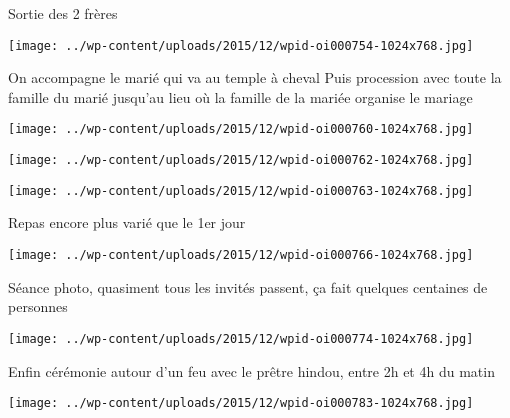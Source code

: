  \newline
 Sortie des 2 frères \newline
 \newline
\centerline{\texttt{[image: ../wp-content/uploads/2015/12/wpid-oi000754-1024x768.jpg]} } 
 \newline
 On accompagne le marié qui va au temple à cheval \newline
 Puis procession avec toute la famille du marié jusqu'au lieu où la famille de la mariée organise le mariage \newline
 \newline
\centerline{\texttt{[image: ../wp-content/uploads/2015/12/wpid-oi000760-1024x768.jpg]} } 
 \newline
 \newline
\centerline{\texttt{[image: ../wp-content/uploads/2015/12/wpid-oi000762-1024x768.jpg]} } 
 \newline
 \newline
\centerline{\texttt{[image: ../wp-content/uploads/2015/12/wpid-oi000763-1024x768.jpg]} } 
 \newline
 Repas encore plus varié que le 1er jour \newline
 \newline
\centerline{\texttt{[image: ../wp-content/uploads/2015/12/wpid-oi000766-1024x768.jpg]} } 
 \newline
 Séance photo, quasiment tous les invités passent, ça fait quelques centaines de personnes \newline
 \newline
\centerline{\texttt{[image: ../wp-content/uploads/2015/12/wpid-oi000774-1024x768.jpg]} } 
 \newline
 Enfin cérémonie autour d'un feu avec le prêtre hindou, entre 2h et 4h du matin \newline
 \newline
\centerline{\texttt{[image: ../wp-content/uploads/2015/12/wpid-oi000783-1024x768.jpg]} } 
 \newline

\newpage
 
